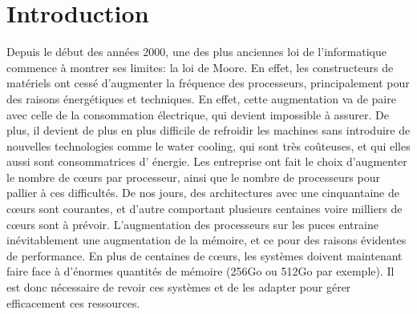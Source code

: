 \section{Introduction}

  \hspace{1cm}Depuis le début des années 2000, une des plus anciennes loi de
  l'informatique commence à montrer ses limites: la loi de Moore. En effet, les
  constructeurs de matériels ont cessé d'augmenter la fréquence des processeurs,
  principalement pour des raisons énergétiques et techniques. En effet, cette
  augmentation va de paire avec celle de la consommation électrique, qui
  devient impossible à assurer. De plus, il devient de plus en plus difficile
  de refroidir les machines sans introduire de nouvelles technologies comme le
  water cooling, qui sont très coûteuses, et qui elles aussi sont consommatrices
  d' énergie. Les entreprise ont fait le choix d'augmenter le nombre de c\oe urs
  par processeur, ainsi que le nombre de processeurs pour pallier à ces
  difficultés. De nos jours, des architectures avec une cinquantaine de c\oe urs
  sont courantes, et d'autre comportant plusieurs centaines voire milliers de
  c\oe urs sont à prévoir. L'augmentation des processeurs sur les puces entraine
  inévitablement une augmentation de la mémoire, et ce pour des raisons
  évidentes de performance. En plus de centaines de c\oe urs, les systèmes
  doivent maintenant faire face à d'énormes quantités de mémoire (256Go ou 512Go
  par exemple). Il est donc nécessaire de revoir ces systèmes et de les adapter
  pour gérer efficacement ces ressources.\newline
  

